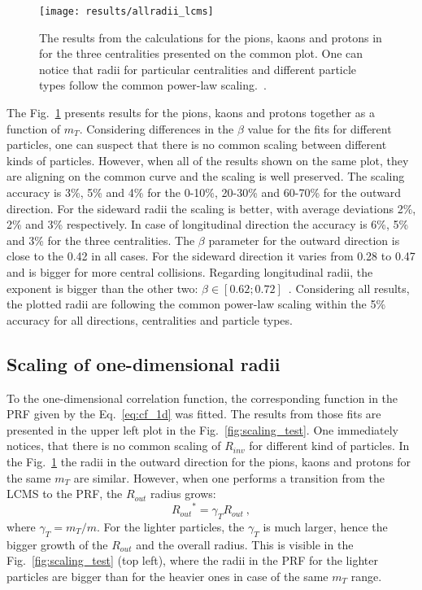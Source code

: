       \begin{figure}[b]
        \centering
        \centerline{\texttt{[image: results/allradii\_lcms]}}
        \caption{The results from the calculations for the pions, kaons and protons in for the three centralities presented on the common plot. One can notice that radii for particular centralities and different particle types follow the common power-law scaling.~\cite{galazyn}.}
      \label{fig:allradii}
      \end{figure}    

      The Fig.~\ref{fig:allradii} presents results for the pions, kaons and protons together as a function of $m_T$.
      Considering differences in the $\beta$ value for the fits for different particles, one can suspect that there is no common scaling between different kinds of particles.
      However, when all of the results shown on the same plot, they are aligning on the common curve and the scaling is well preserved.
      The scaling accuracy is 3\%, 5\% and 4\% for the 0-10\%, 20-30\% and 60-70\% for the outward direction.
      For the sideward radii the scaling is better, with average deviations 2\%, 2\% and 3\% respectively.
      In case of longitudinal direction the accuracy is 6\%, 5\% and 3\% for the three centralities.
      The $\beta$ parameter for the outward direction is close to the 0.42 in all cases.
      For the sideward direction it varies from 0.28 to 0.47 and is bigger for more central collisions.
      Regarding longitudinal radii, the exponent is bigger than the other two: $\beta \in [0.62 ; 0.72]$~.
      Considering all results, the plotted radii are following the common power-law scaling within the 5\% accuracy for all directions, centralities and particle types.
      \FloatBarrier
      \subsection{Scaling of one-dimensional radii}
      To the one-dimensional correlation function, the corresponding function in the PRF given by the Eq.~\ref{eq:cf_1d} was fitted.
      The results from those fits are presented in the upper left plot in the Fig.~\ref{fig:scaling_test}.
      One immediately notices, that there is no common scaling of $R_{inv}$ for different kind of particles.
      In the Fig.~\ref{fig:allradii} the radii in the outward direction for the pions, kaons and protons for the same $m_T$ are similar.
      However, when one performs a transition from the LCMS to the PRF, the $R_{out}$ radius grows:
      \begin{equation}
        {R_{out}}^{*} = \gamma_T R_{out}~,
      \end{equation}
      where $\gamma_T = m_T / m$.
      For the lighter particles, the $\gamma_T$ is much larger, hence the bigger growth of the $R_{out}$ and the overall radius.
      This is visible in the Fig.~\ref{fig:scaling_test} (top left), where the radii in the PRF for the lighter particles are bigger than for the heavier ones in case of the same $m_T$ range.

